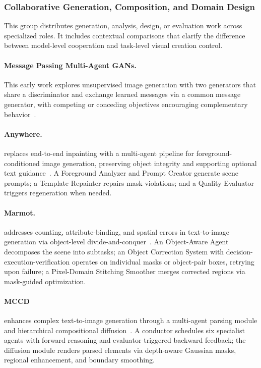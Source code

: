 \subsubsection{Collaborative Generation, Composition, and Domain Design}
This group distributes generation, analysis, design, or evaluation work across specialized roles. It includes contextual comparisons that clarify the difference between model-level cooperation and task-level visual creation control.

\paragraph{Message Passing Multi-Agent GANs.}
This early work explores unsupervised image generation with two generators that share a discriminator and exchange learned messages via a common message generator, with competing or conceding objectives encouraging complementary behavior~\cite{avg161201294}. 

\paragraph{Anywhere.}
 replaces end-to-end inpainting with a multi-agent pipeline for foreground-conditioned image generation, preserving object integrity and supporting optional text guidance~\cite{xie2024anywhere}. A Foreground Analyzer and Prompt Creator generate scene prompts; a Template Repainter repairs mask violations; and a Quality Evaluator triggers regeneration when needed.

\paragraph{Marmot.}
 addresses counting, attribute-binding, and spatial errors in text-to-image generation via object-level divide-and-conquer~\cite{sun2025marmot}. An Object-Aware Agent decomposes the scene into subtasks; an Object Correction System with decision-execution-verification operates on individual masks or object-pair boxes, retrying upon failure; a Pixel-Domain Stitching Smoother merges corrected regions via mask-guided optimization.

\paragraph{MCCD}
 enhances complex text-to-image generation through a multi-agent parsing module and hierarchical compositional diffusion~\cite{avg250502648}. A conductor schedules six specialist agents with forward reasoning and evaluator-triggered backward feedback; the diffusion module renders parsed elements via depth-aware Gaussian masks, regional enhancement, and boundary smoothing.

